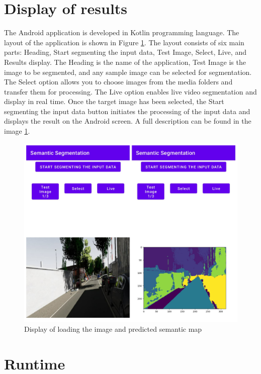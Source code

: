     \section{Display of results}
	
	The Android application is developed in Kotlin programming language. The layout of the application is shown in Figure \ref{fig:android_result}. The layout consists of six main parts: Heading, Start segmenting the input data, Test Image, Select, Live, and Results display. The Heading is the name of the application, Test Image is the image to be segmented, and any sample image can be selected for segmentation. The Select option allows you to choose images from the media folders and transfer them for processing. The Live option enables live video segmentation and display in real time. Once the target image has been selected, the Start segmenting the input data button initiates the processing of the input data and displays the result on the Android screen. A full description can be found in the image \ref{fig:android_result}. 
	
	\begin{figure}
		\centering
		\includegraphics[width=13cm]{images/android_ss.jpg}
		\caption{Display of loading the image and predicted semantic map}
		\label{fig:android_result}
	\end{figure}
    
    \newpage
    \section{Runtime}
	
